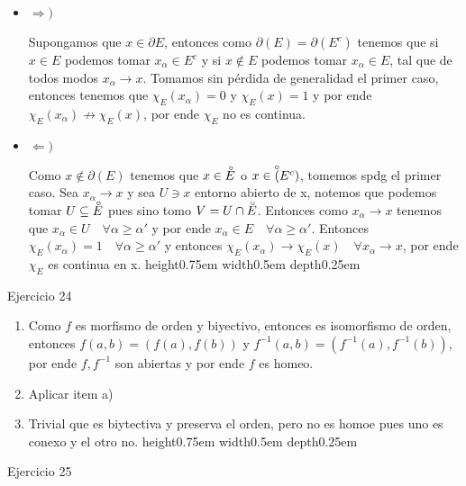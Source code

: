 \documentclass[11pt]{article}
\newcommand{\interior}[1]{\accentset{\smash{\raisebox{-0.12ex}{$\scriptstyle\circ$}}}{#1}\rule{0pt}{2.3ex}}
\newenvironment{proof}[1][Demostraci\'on]{\begin{trivlist}
\item[\hskip \labelsep {\bfseries #1}]}{\end{trivlist}}
\newcommand{\qed}{\nobreak \ifvmode \relax \else
      \ifdim\lastskip<1.5em \hskip-\lastskip
      \hskip1.5em plus0em minus0.5em \fi \nobreak
      \vrule height0.75em width0.5em depth0.25em\fi}
\begin{document}
\begin{enumerate}
\begin{proof}
\begin{itemize}
\item {$\Longrightarrow)$}

Supongamos que $x \in \partial{E}$, entonces como $\partial(E) = \partial(E^{c})$ tenemos que si $x \in E$ podemos tomar $x_{\alpha} \in E^{c}$ y si $x \not \in E$ podemos tomar $x_{\alpha} \in E$, tal que de todos modos $x_{\alpha} \rightarrow x$. Tomamos sin p\'erdida de generalidad el primer caso, entonces tenemos que $\chi_E(x_{\alpha})=0$ y $\chi_E(x)=1$ y por ende $\chi_E(x_{\alpha}) \not \rightarrow \chi_E(x)$, por ende $\chi_E$ no es continua.

\item {$\Longleftarrow)$}

Como $x \not \in \partial(E)$ tenemos que $x \in \interior{E}$ o $x \in \interior(E^{c})$, tomemos spdg el primer caso. Sea $x_{\alpha} \rightarrow x$ y sea $U \ni x$ entorno abierto de x, notemos que podemos tomar $U \subseteq \interior{E}$ pues sino tomo $V = U \cap \interior{E}$. Entonces como $x_{\alpha} \rightarrow x$ tenemos que $x_{\alpha} \in U \quad \forall \alpha \geq \alpha'$ y por ende $x_{\alpha} \in E \quad \forall \alpha \geq \alpha'$. Entonces $\chi_E(x_{\alpha})=1 \quad \forall \alpha \geq \alpha'$ y entonces $\chi_E(x_{\alpha}) \rightarrow \chi_E(x) \quad \forall x_{\alpha} \rightarrow x$, por ende $\chi_E$ es continua en x. \qed

\end{itemize}
\end{proof}

\item {Ejercicio 24}

\begin{proof}
\begin{enumerate}
\item Como $f$ es morfismo de orden y biyectivo, entonces es isomorfismo de orden, entonces $f(a,b)=(f(a),f(b))$ y $f^{-1}(a,b)=(f^{-1}(a),f^{-1}(b))$, por ende $f,f^{-1}$ son abiertas y por ende $f$ es homeo.
\item Aplicar item a)
\item Trivial que es biytectiva y preserva el orden, pero no es homoe pues uno es conexo y el otro no.\qed
\end{enumerate}

\end{proof}

\item {Ejercicio 25}


\end{enumerate}
\end{document}

